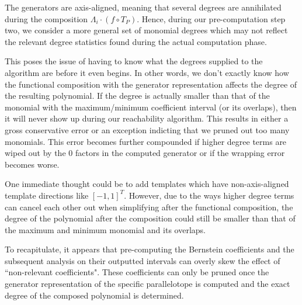 The generators are axis-aligned, meaning that several degrees are annihilated during the composition $\Lambda_i\cdot (f\circ T_P)$. Hence, during our pre-computation step two, we consider a more general set of monomial degrees which may not reflect the relevant degree statistics found during the actual computation phase.

This poses the issue of having to know what the degrees supplied to the algorithm are before it even begins. In other words, we don't exactly know how the functional composition with the generator representation affects the degree of the resulting polynomial. If the degree is actually smaller than that of the monomial with the maximum/minimum coefficient interval (or its overlaps), then it will never show up during our reachability algorithm. This results in either a gross conservative error or an exception indicting that we pruned out too many monomials.
%
This error becomes further compounded if higher degree terms are wiped out by the 0 factors in the computed generator or if the wrapping error becomes worse.

One immediate thought could be to add templates which have non-axis-aligned template directions like $[-1,1]^T$. However, due to the ways higher degree terms can cancel each other out when simplifying after the functional composition, the degree of the polynomial after the composition could still be smaller than that of the maximum and minimum monomial and its overlaps.

To recapitulate, it appears that pre-computing the Bernstein coefficients and the subsequent analysis on their outputted intervals can overly skew the effect of ``non-relevant coefficients". These coefficients can only be pruned once the generator representation of the specific parallelotope is computed and the exact degree of the composed polynomial is determined.

